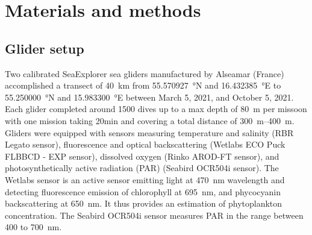 \documentclass[../Main.tex]{subfiles}
\begin{document}
\section*{\crule[blue]{.3cm}{.3cm} Materials and methods}
\subsection*{\crule[blue]{.2cm}{.2cm} Glider setup}
Two calibrated SeaExplorer sea gliders manufactured by Alseamar (France) accomplished a transect of \SI{40}{km} from \SI{55.570927}{\degree}N and \SI{16.432385}{\degree}E to \SI{55.250000}{\degree}N and \SI{15.983300}{\degree}E between March 5, 2021, and October 5, 2021. 
Each glider completed around 1500 dives up to a max depth of \SI{80}{m} per missoon with one mission taking 20min and covering a total distance of \SIrange{300}{400}{m}.  
\\ 
Gliders were equipped with sensors measuring temperature and salinity (RBR Legato sensor), fluorescence and optical backscattering (Wetlabs ECO Puck FLBBCD - EXP sensor), dissolved oxygen (Rinko AROD-FT sensor), and photosynthetically active radiation (PAR) (Seabird OCR504i sensor). 
The Wetlabs sensor is an active sensor emitting light at \SI{470}{nm} wavelength and detecting fluorescence emission of chlorophyll at \SI{695}{nm}, and phycocyanin backscattering at \SI{650}{nm}. 
It thus provides an estimation of phytoplankton concentration. 
The Seabird OCR504i sensor measures PAR in the range between 400 to \SI{700}{nm}\supercite{ACSA2014}.
\end{document}
